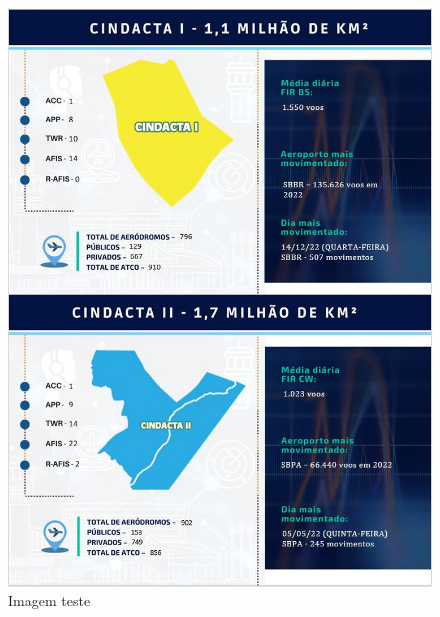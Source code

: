 \documentclass[
]{book}
\theoremstyle{definition}
\theoremstyle{definition}
\theoremstyle{definition}
\theoremstyle{definition}
\theoremstyle{remark}
\begin{document}
\begin{figure}
\centering
\includegraphics{imagens/fig3.jpg}
\caption{Imagem teste}
\end{figure}
\end{document}
